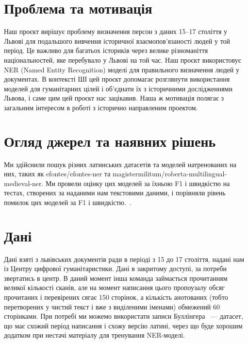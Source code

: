 \documentclass[ukrainian]{ucuproposal}
\begin{document}
\maketitlepage

\section{Проблема та мотивація}
Наш проєкт вирішує проблему визначення персон з даних 15–17 століття у Львові для подальшого вивчення історичної взаємопов'язаності людей у той період. Це важливо для багатьох істориків через велике різноманіття національностей, яке перебувало у Львові на той час. Наш проєкт використовує NER (Named Entity Recognition) моделі для правильного визначення людей у документах. В контексті ШІ цей проєкт допомагає розглянути використання моделей для гуманітарних цілей і об'єднати їх з історичними дослідженнями Львова, і саме цим цей проєкт нас зацікавив. Наша ж мотивація полягає з загальним інтересом в роботі з історично направленим проектом.

\section{Огляд джерел та наявних рішень}

Ми здійснили пошук різних латинських датасетів та моделей натренованих на них, таких як efontes/efontes-ner та magistermilitum/roberta-multilingual-medieval-ner. Ми провели оцінку цих моделей за їхньою F1 і швидкістю на тестах, створених за наданими нам текстовими даними, і порівняли рівень помилок цих моделей за F1 і швидкістю.~\cite{efontes_ner,magistermilitum_roberta_medieval,alcar_ner, medieval_multilingual_ner, lasla_latin, ibm_ner}.

\section{Дані}
Дані взяті з львівських документів ради в періоді з 15 до 17 століття, надані нам із Центру цифрової гуманітаристики. Дані в закритому доступі, за потреби звертатись в центр. В даний момент інша команда займається прочитанням великої кількості сканів, але на момент написання цього пропоузалу обсяг прочитаних і перевірених сягає 150 сторінок, а кількість анотованих (тобто перетворених у чистий текст і вже з виділеними іменами) обмежений 60 сторінками. При потребі ми можемо використати записи Буллінгера~\cite{bullinger_digital} — датасет, що має схожий період написання і схожу версію латині, через що буде хорошим додатком при нестачі матеріалу для тренування NER-моделі. 
\end{document}
